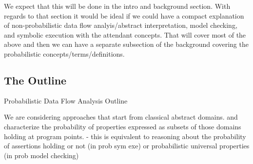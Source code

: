 We expect that this will be done in the intro and background section.   With
regards to that section it would be ideal if we could have a compact
explanation of non-probabilistic data flow analyis/abstract interpretation,
model checking, and symbolic execution with the attendant concepts.
That will cover most of the above and then we can have a separate
subsection of the background covering the probabilistic 
concepts/terms/definitions.

\subsection{The Outline}

Probabilistic Data Flow Analysis Outline

We are considering approaches that start from classical abstract domains.
and characterize the probability of properties expressed as subsets
of those domains holding at program points.
  - this is equivalent to reasoning about the probability of assertions
    holding or not (in prob sym exe) or probabilistic universal properties
    (in prob model checking) 

